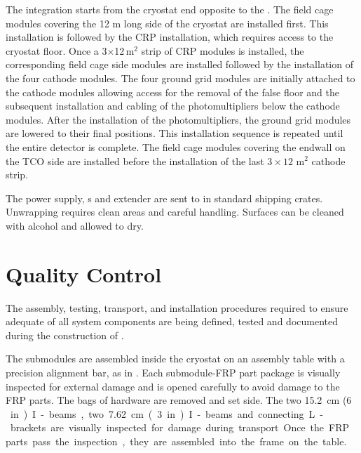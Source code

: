 The integration starts from  the cryostat end opposite to the .  The field cage modules covering the 12 m long side of the cryostat are installed  first. This installation is followed by the CRP installation, which requires access to the cryostat floor. Once a 3$\times$12\,m$^2$ strip of CRP modules is installed, the corresponding field cage side modules are installed followed by the installation of the four cathode modules. The four ground grid modules are initially attached to the cathode modules allowing access for the removal of the false floor  and the subsequent installation and cabling of the photomultipliers below the cathode modules.  After the installation of the photomultipliers, the ground grid modules are lowered to their final positions. This installation sequence is repeated until %
the entire detector is complete. The field cage modules covering the endwall on the TCO side are installed before the installation of the last  $3 \times 12$ m$^2$ cathode strip.


The power supply, \fdth{}s and  extender are sent to \surf in standard shipping crates. Unwrapping requires clean areas and careful handling. Surfaces can be cleaned with alcohol and allowed to dry.


\section{Quality Control}
\label{sec:fddp-hv-qc}

The assembly, testing, transport, and installation procedures required to ensure adequate  of all  system components are being defined, tested and documented during the construction of .

The  submodules are assembled inside the cryostat on an assembly table with a precision alignment bar, as in .  %
Each submodule-FRP part package is visually inspected for external damage and is opened carefully to avoid damage to the FRP parts.  
The bags of hardware are removed and set side.   The two \SI{15.2}{\cm} (\SI{6}\,in) I-beams, two \SI{7.62}{cm} (\SI{3}{in}) I-beams and connecting L-brackets are visually inspected for  damage during transport.  Once the FRP parts pass the inspection, they are assembled into the frame on the table.  

